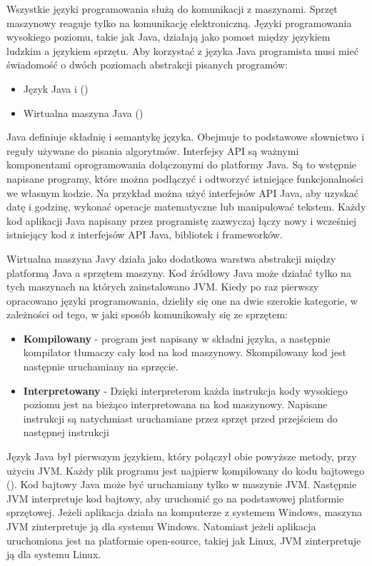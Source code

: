 Wszystkie języki programowania służą do komunikacji z maszynami. Sprzęt maszynowy reaguje tylko na komunikację elektroniczną. Języki programowania wysokiego poziomu, takie jak Java, działają jako pomost między językiem ludzkim a językiem sprzętu. Aby korzystać z języka Java programista musi mieć świadomość o dwóch poziomach abstrakcji pisanych programów: 

\begin{itemize}
    \item Język Java i ()
    \item Wirtualna maszyna Java  ()
\end{itemize}

Java definiuje składnię i semantykę języka. Obejmuje to podstawowe słownictwo i reguły używane do pisania algorytmów. 
Interfejsy API są ważnymi komponentami oprogramowania dołączonymi do platformy Java. Są to wstępnie napisane programy, które można podłączyć i odtworzyć istniejące funkcjonalności we własnym kodzie. Na przykład można użyć interfejsów API Java, aby uzyskać datę i godzinę, wykonać operacje matematyczne lub manipulować tekstem. Każdy kod aplikacji Java napisany przez programistę zazwyczaj łączy nowy i wcześniej istniejący kod z interfejsów API Java, bibliotek i frameworków\cite{frameworkDef}\cite{javaAmazon}\cite{javaDEV}.

Wirtualna maszyna Javy działa jako dodatkowa warstwa abstrakcji między platformą Java a sprzętem maszyny. Kod źródłowy Java może działać tylko na tych maszynach na których zainstalowano JVM. Kiedy po raz pierwszy opracowano języki programowania, dzieliły się one na dwie szerokie kategorie, w zależności od tego, w jaki sposób komunikowały się ze sprzętem: 

\begin{itemize}
    \item \textbf{Kompilowany} - program jest napisany w składni języka, a następnie kompilator tłumaczy cały kod na kod maszynowy. Skompilowany kod jest następnie uruchamiany na sprzęcie.
    \item \textbf{Interpretowany} - Dzięki interpreterom każda instrukcja kody wysokiego poziomu jest na bieżąco interpretowana na kod maszynowy. Napisane instrukcji są natychmiast uruchamiane przez sprzęt przed przejściem do następnej instrukcji
\end{itemize}

Język Java był pierwszym językiem, który połączył obie powyższe metody, przy użyciu JVM. Każdy plik programu jest najpierw kompilowany do kodu bajtowego (). Kod bajtowy Java może być uruchamiany tylko w maszynie JVM. Następnie JVM interpretuje kod bajtowy, aby uruchomić go na podstawowej platformie sprzętowej. Jeżeli aplikacja działa na komputerze z systemem Windows, maszyna JVM zinterpretuje ją dla systemu Windows. Natomiast jeżeli aplikacja uruchomiona jest na platformie open-source, takiej jak Linux, JVM zinterpretuje ją dla systemu Linux\cite{javaAmazon}\cite{javaDEV}.

